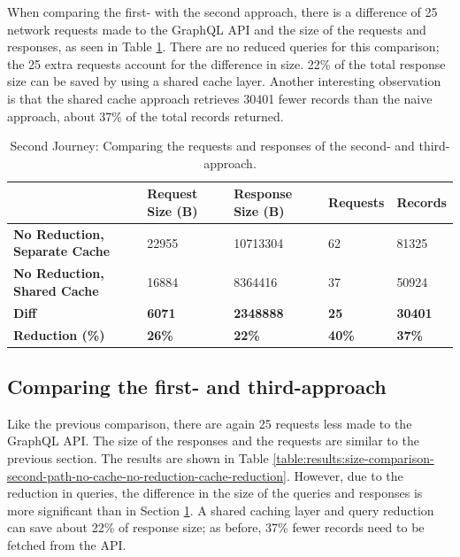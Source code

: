 When comparing the first- with the second approach, there is a difference of 25 network requests made to the GraphQL \ac{API} and the size of the requests and responses, as seen in Table \ref{table:results:size-comparison-second-path-cache-no-reduction-cache-reduction}. There are no reduced queries for this comparison; the 25 extra requests account for the difference in size. 22\% of the total response size can be saved by using a shared cache layer. Another interesting observation is that the shared cache approach retrieves 30401 fewer records than the naive approach, about 37\% of the total records returned.

\ifshowTables
\begin{table}[H]
  \begin{tabular}{|l|l|l|l|l|}
  \hline
  & \textbf{Request Size (B)} & \textbf{Response Size (B)} & \textbf{Requests} & \textbf{Records} \\
  \hline
  \textbf{No Reduction, Separate Cache} & 22955 & 10713304 & 62 & 81325 \\
  \hline
  \textbf{No Reduction, Shared Cache} & 16884 & 8364416 & 37 & 50924 \\
  \hline
  \hline
  \textbf{Diff} & \textbf{6071} & \textbf{2348888} & \textbf{25} & \textbf{30401} \\
  \hline
  \textbf{Reduction (\%)} & \textbf{26\%} & \textbf{22\%} & \textbf{40\%} & \textbf{37\%} \\
  \hline
  \end{tabular}
  \caption{Second Journey: Comparing the requests and responses of the second- and third-approach.}\label{table:results:size-comparison-second-path-cache-no-reduction-cache-reduction}
\end{table}
\fi

\subsection{Comparing the first- and third-approach}\label{subsection:results:comparison-second-path-second-third-approach}

Like the previous comparison, there are again 25 requests less made to the GraphQL \ac{API}. The size of the responses and the requests are similar to the previous section. The results are shown in Table \ref{table:results:size-comparison-second-path-no-cache-no-reduction-cache-reduction}. However, due to the reduction in queries, the difference in the size of the queries and responses is more significant than in Section \ref{table:results:size-comparison-second-path-cache-no-reduction-cache-reduction}. A shared caching layer and query reduction can save about 22\% of response size; as before, 37\% fewer records need to be fetched from the \ac{API}.

